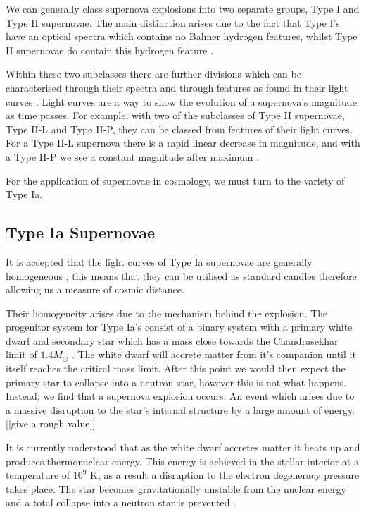 \documentclass[twocolumn]{revtex4}
\begin{document}
We can generally class supernova explosions into two separate groups, Type I and Type II supernovae. The main distinction arises due to the fact that Type I's have an optical spectra which contains no Balmer hydrogen features, whilst Type II supernovae do contain this hydrogen feature \cite{mod_ast}. 

Within these two subclasses there are further divisions which can be characterised through their spectra and through features as found in their light curves \cite{obs_phys_class_sn}. Light curves are a way to show the evolution of a supernova's magnitude as time passes. For example, with two of the subclasses of Type II supernovae, Type II-L and Type II-P, they can be classed from features of their light curves. For a Type II-L supernova there is a rapid linear decrease in magnitude, and with a Type II-P we see a constant magnitude after maximum \cite{mod_ast}.

For the application of supernovae in cosmology, we must turn to the variety of Type Ia.

\vspace{-3ex}
\subsection{Type Ia Supernovae}
\vspace{-2ex}
It is accepted that the light curves of Type Ia supernovae are generally homogeneous \cite{posn}, this means that they can be utilised as standard candles therefore allowing us a measure of cosmic distance. 

Their homogeneity arises due to the mechanism behind the explosion. The progenitor system for Type Ia's consist of a binary system with a primary white dwarf and secondary star which has a mass close towards the Chandrasekhar limit of $1.4 M_{\odot}$ \cite{mod_ast, posn}. The white dwarf will accrete matter from it's companion until it itself reaches the critical mass limit. After this point we would then expect the primary star to collapse into a neutron star, however this is not what happens. Instead, we find that a supernova explosion occurs. An event which arises due to a massive disruption to the star's internal structure by a large amount of energy. [[give a rough value]]

It is currently understood that as the white dwarf accretes matter it heats up and produces thermonuclear energy. This energy is achieved in the stellar interior at a temperature of $10^9$ K, as a result a disruption to the electron degeneracy pressure takes place. The star becomes gravitationally unstable from the nuclear energy and a total collapse into a neutron star is prevented \cite{longair, posn}.
\end{document}

